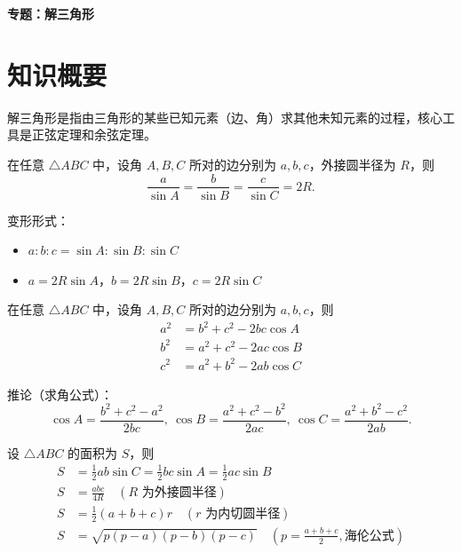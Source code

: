 \documentclass[11pt]{ctexrep}
\begin{document}
\begin{center}
    {\Large\bfseries 专题：解三角形}
\end{center}

\section*{知识概要}

解三角形是指由三角形的某些已知元素（边、角）求其他未知元素的过程，核心工具是正弦定理和余弦定理。

\begin{definition}[正弦定理]
    在任意 $\triangle ABC$ 中，设角 $A, B, C$ 所对的边分别为 $a, b, c$，外接圆半径为 $R$，则
    \[
        \frac{a}{\sin A} = \frac{b}{\sin B} = \frac{c}{\sin C} = 2R.
    \]
    
    变形形式：
    \begin{itemize}
        \item $a : b : c = \sin A : \sin B : \sin C$
        \item $a = 2R\sin A$，$b = 2R\sin B$，$c = 2R\sin C$
    \end{itemize}
\end{definition}

\begin{definition}[余弦定理]
    在任意 $\triangle ABC$ 中，设角 $A, B, C$ 所对的边分别为 $a, b, c$，则
    \begin{align*}
        a^2 &= b^2 + c^2 - 2bc\cos A \\
        b^2 &= a^2 + c^2 - 2ac\cos B \\
        c^2 &= a^2 + b^2 - 2ab\cos C
    \end{align*}
    
    推论（求角公式）：
    \[
        \cos A = \frac{b^2 + c^2 - a^2}{2bc},\ \cos B = \frac{a^2 + c^2 - b^2}{2ac},\ \cos C = \frac{a^2 + b^2 - c^2}{2ab}.
    \]
\end{definition}

\begin{definition}[三角形面积公式]
    设 $\triangle ABC$ 的面积为 $S$，则
    \begin{align*}
        S &= \frac{1}{2}ab\sin C = \frac{1}{2}bc\sin A = \frac{1}{2}ac\sin B \\
        S &= \frac{abc}{4R} \quad (R\text{ 为外接圆半径}) \\
        S &= \frac{1}{2}(a + b + c)r \quad (r\text{ 为内切圆半径}) \\
        S &= \sqrt{p(p-a)(p-b)(p-c)} \quad (p = \frac{a+b+c}{2},\text{海伦公式})
    \end{align*}
\end{definition}
\end{document}
